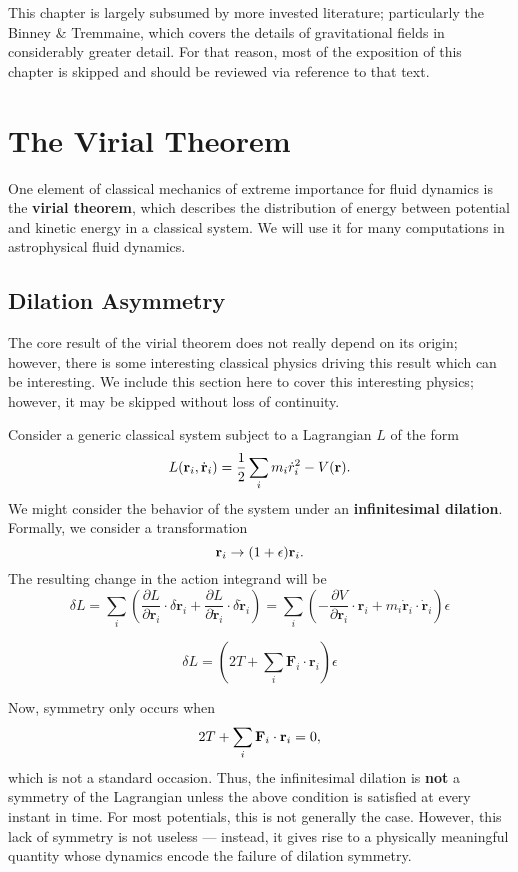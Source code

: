 \begin{remark}
    This chapter is largely subsumed by more invested literature; particularly the Binney \& Tremmaine, which covers the details of gravitational fields in considerably greater detail. For that reason, most of the exposition of this chapter is skipped and should be reviewed via reference to that text.
\end{remark}

\section{The Virial Theorem}

One element of classical mechanics of extreme importance for fluid dynamics is the \textbf{virial theorem}, which describes the distribution of energy between potential and kinetic energy in a classical system. We will use it for many computations in astrophysical fluid dynamics.

\subsection{Dilation Asymmetry}

The core result of the virial theorem does not really depend on its origin; however, there is some interesting classical physics driving this result which can be interesting. We include this section here to cover this interesting physics; however, it may be skipped without loss of continuity.

Consider a generic classical system subject to a Lagrangian $L$ of the form
\[
L({\bf r}_i,\dot{\bf r}_i) = \frac{1}{2}\sum_i m_i \dot{r}_i^2 - V({\bf r}).
\]
We might consider the behavior of the system under an \textbf{infinitesimal dilation}. Formally, we consider a transformation
\[
{\bf r}_i \to (1+\epsilon){\bf r}_i.
\]
The resulting change in the action integrand will be
\[
\delta L = \sum_i \left( \frac{\partial L}{\partial \mathbf{r}_i} \cdot \delta \mathbf{r}_i + \frac{\partial L}{\partial \dot{\mathbf{r}}_i} \cdot \delta \dot{\mathbf{r}}_i \right)
= \sum_i \left( -\frac{\partial V}{\partial \mathbf{r}_i} \cdot \mathbf{r}_i + m_i \dot{\mathbf{r}}_i \cdot \dot{\mathbf{r}}_i \right) \epsilon
\]

\[
\delta L = \left(2T + \sum_i \mathbf{F}_i \cdot \mathbf{r}_i \right) \epsilon
\]

Now, symmetry only occurs when
\[
2T + \sum_i {\bf F}_i \cdot {\bf r}_i = 0,
\]
which is not a standard occasion. Thus, the infinitesimal dilation is \textbf{not} a symmetry of the Lagrangian unless the above condition is satisfied at every instant in time. For most potentials, this is not generally the case. However, this lack of symmetry is not useless — instead, it gives rise to a physically meaningful quantity whose dynamics encode the failure of dilation symmetry.


